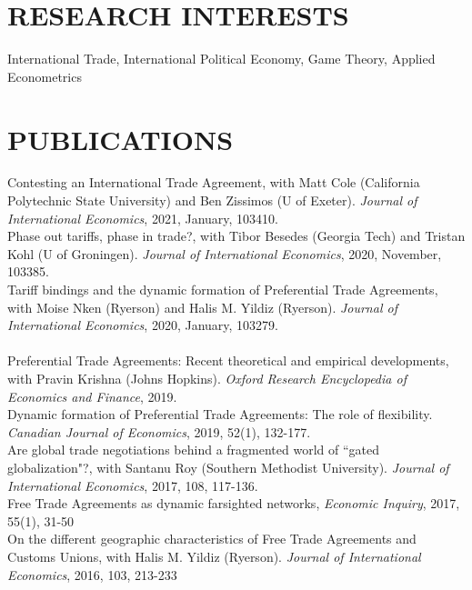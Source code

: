 \documentclass[11pt]{res}
\begin{document}
\begin{resume}
\section{RESEARCH INTERESTS}\vspace{1.5mm}
International Trade, International Political Economy, Game Theory, Applied Econometrics

\section{PUBLICATIONS}\vspace{1.5mm}
{Contesting an International Trade Agreement}, with Matt Cole (California Polytechnic State University) and Ben Zissimos (U of Exeter). \emph{Journal of International Economics}, 2021, January, 103410.\vspace{1.5mm}\\
{Phase out tariffs, phase in trade?}, with Tibor Besedes (Georgia Tech) and Tristan Kohl (U of Groningen). \emph{Journal of International Economics}, 2020, November, 103385.\vspace{1.5mm}\\
{Tariff bindings and the dynamic formation of Preferential Trade Agreements}, with Moise Nken (Ryerson) and Halis M. Yildiz (Ryerson). \emph{Journal of International Economics}, 2020, January, 103279.\vspace{1.5mm}\\
\\
{Preferential Trade Agreements: Recent theoretical and empirical developments}, with Pravin Krishna (Johns Hopkins). \emph{Oxford Research Encyclopedia of Economics and Finance}, 2019.\vspace{1.5mm}\\
{Dynamic formation of Preferential Trade Agreements: The role of flexibility}. \emph{Canadian Journal of Economics}, 2019, 52(1), 132-177. \vspace{1.5mm}\\
{Are global trade negotiations behind a fragmented world of ``gated globalization"?}, with Santanu Roy (Southern Methodist University). \emph{Journal of International Economics}, 2017, 108, 117-136.\vspace{1.5mm}\\
{ Free Trade Agreements as dynamic farsighted networks}, \emph{Economic Inquiry}, 2017, 55(1), 31-50\vspace{1.5mm}\\
{On the different geographic characteristics of Free Trade Agreements and Customs Unions}, with Halis M. Yildiz (Ryerson). \emph{Journal of International Economics}, 2016, 103, 213-233 \vspace{1.5mm}\\

\end{resume}
\end{document}
